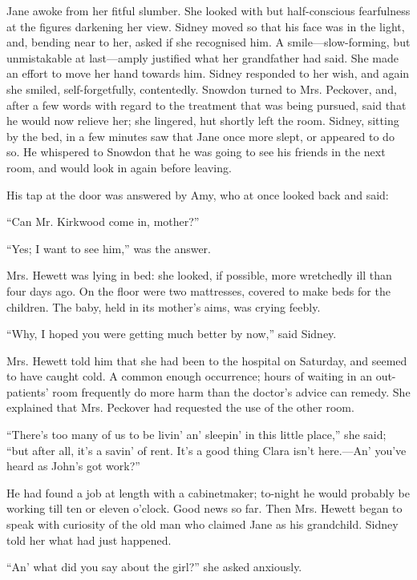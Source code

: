 Jane awoke from her fitful slumber. She looked with but half-conscious
fearfulness at the figures darkening her view. Sidney moved so that his
face was in the light, and, bending near to her, asked if she recognised
him. A smile---slow-forming, but unmistakable at last---amply justified
what her grandfather had said. She made an effort to move her hand
towards him. Sidney responded to her wish, and again she smiled,
self-forgetfully, contentedly. Snowdon turned to Mrs. Peckover, and,
after a few words with regard to the
{\protect\hypertarget{150}{}{}}treatment that was being pursued, said
that he would now relieve her; she lingered, hut shortly left the room.
Sidney, sitting by the bed, in a few minutes saw that Jane once more
slept, or appeared to do so. He whispered to Snowdon that he was going
to see his friends in the next room, and would look in again before
leaving.

His tap at the door was answered by Amy, who at once looked back and
said:

``Can Mr. Kirkwood come in, mother?''

``Yes; I want to see him,'' was the answer.

Mrs. Hewett was lying in bed: she looked, if possible, more wretchedly
ill than four days ago. On the floor were two mattresses, covered to
make beds for the children. The baby, held in its mother's aims, was
crying feebly.

``Why, I hoped you were getting much better by now,'' said Sidney.

Mrs. Hewett told him that she had been to the hospital on Saturday, and
seemed to have caught cold. A common enough occurrence; hours of waiting
in an out-patients' {\protect\hypertarget{151}{}{}}room frequently do
more harm than the doctor's advice can remedy. She explained that Mrs.
Peckover had requested the use of the other room.

``There's too many of us to be livin' an' sleepin' in this little
place,'' she said; ``but after all, it's a savin' of rent. It's a good
thing Clara isn't here.---An' you've heard as John's got work?''

He had found a job at length with a cabinetmaker; to-night he would
probably be working till ten or eleven o'clock. Good news so far. Then
Mrs. Hewett began to speak with curiosity of the old man who claimed
Jane as his grandchild. Sidney told her what had just happened.

``An' what did you say about the girl?'' she asked anxiously.

